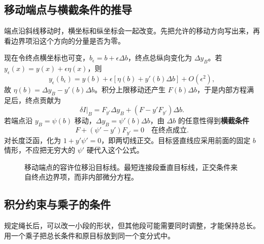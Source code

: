 \subsection{移动端点与横截条件的推导}
端点沿斜线移动时，横坐标和纵坐标会一起改变。先把允许的移动方向写出来，再看边界项沿这个方向的分量是否为零。

现在令终点横坐标也可变，$b_\epsilon=b+\epsilon\Delta b$，终点总纵向变化为 $\Delta y_B$。若 $y_\epsilon(x)=y(x)+\epsilon\eta(x)$，则
\[
y_\epsilon(b_\epsilon)=y(b)+\epsilon[\eta(b)+y'(b)\Delta b]+O(\epsilon^2),
\]
故 $\eta(b)=\Delta y_B-y'(b)\Delta b$。积分上限移动还产生 $F(b)\Delta b$，于是内部方程满足后，终点贡献为
\begin{equation}\label{eq:var-transversality}
\delta I\big|_B=F_{y'}\Delta y_B+(F-y'F_{y'})\Delta b.
\end{equation}
若端点沿 $y_B=\psi(b)$ 移动，$\Delta y_B=\psi'(b)\Delta b$，由 $\Delta b$ 的任意性得到\textbf{横截条件}
\[
\boxed{F+(\psi'-y')F_{y'}=0\quad\text{在终点成立}.}
\]
对长度泛函，化为 $1+y'\psi'=0$，即两切线正交。目标竖直线应采用前面的固定 $b$ 情形，不应把无穷大的 $\psi'$ 硬代入这个公式。
\begin{figure}[htbp]
\centering
{}
\caption{移动端点的容许位移沿目标线。最短连接段垂直目标线，正交条件来自终点边界项，而非内部微分方程。}
\label{fig:var-free-end}
\end{figure}

\subsection{积分约束与乘子的条件}
规定绳长后，可以改一小段的形状，但其他段可能需要同时调整，才能保持总长。用一个乘子把总长条件和原目标放到同一个变分式中。

